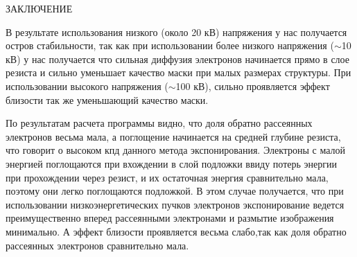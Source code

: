\begin{center}
ЗАКЛЮЧЕНИЕ
\end{center}
В результате использования низкого (около 20 кВ) напряжения у нас получается остров стабильности,
так как при использовании более низкого напряжения (\(\sim\)10 кВ) у нас получается что сильная диффузия электронов начинается прямо в слое резиста и сильно уменьшает качество маски при малых размерах структуры.
При использовании высокого напряжения (\(\sim\)100 кВ), сильно проявляется эффект близости так же уменьшающий качество маски.

По результатам расчета программы видно, что доля обратно рассеянных электронов весьма мала, а поглощение начинается на средней глубине резиста, что говорит о высоком кпд данного метода экспонирования. Электроны с малой энергией поглощаются при вхождении в слой подложки ввиду потерь энергии при прохождении через резист, и их остаточная энергия сравнительно мала, поэтому они легко поглощаются подложкой. В этом случае получается, что при использовании низкоэнергетических пучков электронов экспонирование ведется преимущественно вперед рассеянными электронами и размытие изображения минимально. А эффект близости проявляется весьма слабо,так как доля обратно рассеянных электронов сравнительно мала.

